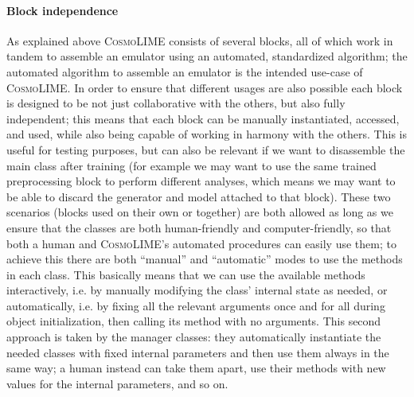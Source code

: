 \paragraph{Block independence}
As explained above \textsc{CosmoLIME} consists of several blocks, all of which work in tandem to assemble an emulator using an automated, standardized algorithm; the automated algorithm to assemble an emulator is the intended use-case of \textsc{CosmoLIME}. 
In order to ensure that different usages are also possible each block is designed to be not just collaborative with the others, but also fully independent; this means that each block can be manually instantiated, accessed, and used, while also being capable of working in harmony with the others. This is useful for testing purposes, but can also be relevant if we want to disassemble the main class after training (for example we may want to use the same trained preprocessing block to perform different analyses, which means we may want to be able to discard the generator and model attached to that block).
These two scenarios (blocks used on their own or together) are both allowed as long as we ensure that the classes are both human-friendly and computer-friendly, so that both a human and \textsc{CosmoLIME}'s automated procedures can easily use them; to achieve this there are both ``manual'' and ``automatic'' modes to use the methods in each class. This basically means that we can use the available methods interactively, i.e. by manually modifying the class' internal state as needed, or automatically, i.e. by fixing all the relevant arguments once and for all during object initialization, then calling its method with no arguments. This second approach is taken by the manager classes: they automatically instantiate the needed classes with fixed internal parameters and then use them always in the same way; a human instead can take them apart, use their methods with new values for the internal parameters, and so on.

